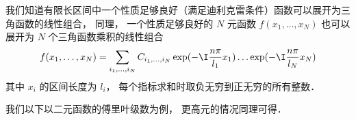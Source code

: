 

我们知道有限长区间中一个性质足够良好（满足迪利克雷条件）函数可以展开为三角函数的线性组合， 同理， 一个性质足够良好的 $N$ 元函数 $f(x_1, \dots, x_N)$ 也可以展开为 $N$ 个三角函数乘积的线性组合
\begin{equation}
f(x_1, \dots, x_N) = \sum_{i_1,\dots, i_N} C_{i_1,\dots, i_N} \exp(-\I \frac{n\pi}{l_1} x_1) \dots \exp(-\I \frac{n\pi}{l_N} x_N)
\end{equation}
其中 $x_i$ 的区间长度为 $l_i$， 每个指标求和时取负无穷到正无穷的所有整数．

我们以下以二元函数的傅里叶级数为例， 更高元的情况同理可得．
